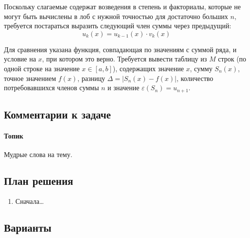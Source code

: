 Поскольку слагаемые содержат возведения в степень и факториалы, которые не
могут быть вычислены в лоб с нужной точностью для достаточно больших $n$,
требуется постараться выразить следующий член суммы через предыдущий:
%
\[
u_k(x) = u_{k-1}(x)\cdot v_k(x)
\]

Для сравнения указана функция, совпадающая по значениям с суммой ряда, и
условие на $x$, при котором это верно. Требуется вывести таблицу из $M$ строк
(по одной строке на значение $x \in [a,b]$), содержащих значение $x$, сумму
$S_n(x)$, точное значением $f(x)$, разницу $\Delta = |S_n(x) - f(x)|$,
количество потребовавшихся членов суммы $n$ и значение
$\varepsilon(S_n)=u_{n+1}$.


\subsection*{Комментарии к задаче}


\paragraph{Топик}
Мудрые слова на тему.


\subsection*{План решения}


\begin{enumerate}
\item Сначала\dots
\end{enumerate}


\subsection*{Варианты}



